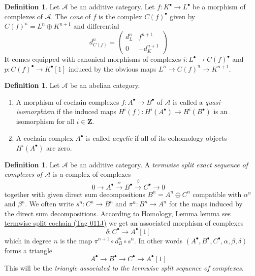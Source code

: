 \documentclass{amsart}
\theoremstyle{plain}
\theoremstyle{definition}
\newtheorem{definition}[subsection]{Definition}
\theoremstyle{remark}
\numberwithin{equation}{subsection}
\begin{document}
\begin{definition}
\label{derived-definition-cone}
Let $\mathcal{A}$ be an additive category.
Let $f : K^\bullet \to L^\bullet$ be a morphism of
complexes of $\mathcal{A}$. The {\it cone} of $f$
is the complex $C(f)^\bullet$ given by
$C(f)^n = L^n \oplus K^{n + 1}$ and
differential
$$
d_{C(f)}^n =
\left(
\begin{matrix}
d^n_L & f^{n + 1} \\
0 & -d_K^{n + 1}
\end{matrix}
\right)
$$
It comes equipped with canonical morphisms of complexes
$i : L^\bullet \to C(f)^\bullet$ and $p : C(f)^\bullet \to K^\bullet[1]$
induced by the obvious maps $L^n \to C(f)^n \to K^{n + 1}$.
\end{definition}

\begin{definition}
\label{homology-definition-quasi-isomorphism-cochain}
Let $\mathcal{A}$ be an abelian category.
\begin{enumerate}
\item A morphism of cochain complexes $f : A^\bullet \to B^\bullet$
of $\mathcal{A}$ is called a {\it quasi-isomorphism} if the induced
maps $H^i(f) : H^i(A^\bullet) \to H^i(B^\bullet)$
is an isomorphism for all $i \in \mathbf{Z}$.
\item A cochain complex $A^\bullet$ is called
{\it acyclic} if all of its cohomology objects
$H^i(A^\bullet)$ are zero.
\end{enumerate}
\end{definition}

\begin{definition}
\label{derived-definition-split-ses}
Let $\mathcal{A}$ be an additive category.
A {\it termwise split exact sequence of complexes of $\mathcal{A}$}
is a complex of complexes
$$
0 \to
A^\bullet \xrightarrow{\alpha}
B^\bullet \xrightarrow{\beta}
C^\bullet \to 0
$$
together with given direct sum decompositions
$B^n = A^n \oplus C^n$
compatible with $\alpha^n$ and $\beta^n$.
We often write $s^n : C^n \to B^n$ and $\pi^n : B^n \to A^n$
for the maps induced by the direct sum decompositions.
According to
Homology, Lemma \href{https://stacks.math.columbia.edu/tag/011J}{lemma ses termwise split cochain (Tag 011J)}
we get an associated morphism of complexes
$$
\delta : C^\bullet \longrightarrow A^\bullet[1]
$$
which in degree $n$ is the map $\pi^{n + 1} \circ d_B^n \circ s^n$.
In other words
$(A^\bullet, B^\bullet, C^\bullet, \alpha, \beta, \delta)$
forms a triangle
$$
A^\bullet \to B^\bullet \to C^\bullet \to A^\bullet[1]
$$
This will be the {\it triangle associated to the termwise
split sequence of complexes}.
\end{definition}
\end{document}

